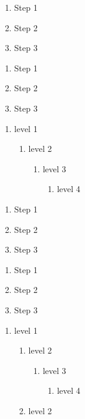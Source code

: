 \begin{enumerate}
\item Step 1
\item Step 2
\item Step 3
\end{enumerate}

\begin{enumerate}
\item Step 1
\item Step 2
\item Step 3
\end{enumerate}

\begin{enumerate}
\item level 1
\begin{enumerate}
\item level 2
\begin{enumerate}
\item level 3
\begin{enumerate}
\item level 4
\end{enumerate}
\end{enumerate}
\end{enumerate}
\end{enumerate}

\begin{enumerate}
\item Step 1
\item Step 2
\item Step 3
\end{enumerate}

\begin{enumerate}
\item Step 1
\item Step 2
\item Step 3
\end{enumerate}

\begin{enumerate}
\item level 1
\begin{enumerate}
\item level 2
\begin{enumerate}
\item level 3
\begin{enumerate}
\item level 4
\end{enumerate}
\end{enumerate}
\item level 2
\end{enumerate}
\end{enumerate}

